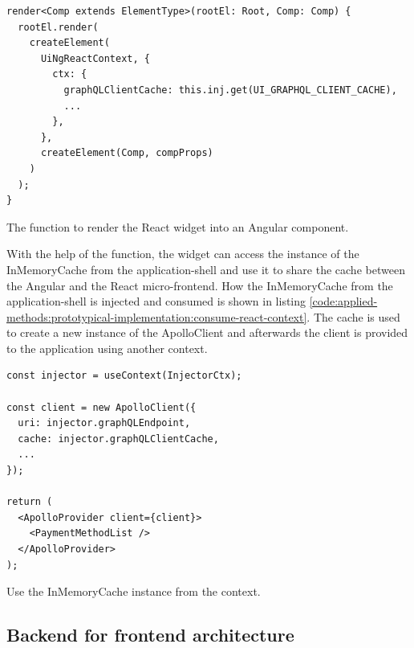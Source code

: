 \ifshowListings
\begin{listing}[H]
    \begin{verbatim}
render<Comp extends ElementType>(rootEl: Root, Comp: Comp) {
  rootEl.render(
    createElement(
      UiNgReactContext, {
        ctx: {
          graphQLClientCache: this.inj.get(UI_GRAPHQL_CLIENT_CACHE),
          ...
        },
      },
      createElement(Comp, compProps)
    )
  );
}
    \end{verbatim}
    \caption{The function to render the React widget into an Angular component.}\label{code:applied-methods:prototypical-implementation:render-react-component-with-context}
\end{listing}
\fi

\noindent With the help of the function, the widget can access the instance of the InMemoryCache from the application-shell and use it to share the cache between the Angular and the React micro-frontend. How the InMemoryCache from the application-shell is injected and consumed is shown in listing \ref{code:applied-methods:prototypical-implementation:consume-react-context}. The cache is used to create a new instance of the ApolloClient and afterwards the client is provided to the application using another context.

\ifshowListings
\begin{listing}[H]
    \begin{verbatim}
const injector = useContext(InjectorCtx);

const client = new ApolloClient({
  uri: injector.graphQLEndpoint,
  cache: injector.graphQLClientCache,
  ...
});

return (
  <ApolloProvider client={client}>
    <PaymentMethodList />
  </ApolloProvider>
);

    \end{verbatim}
    \caption{Use the InMemoryCache instance from the context.}\label{code:applied-methods:prototypical-implementation:consume-react-context}
\end{listing}
\fi

\subsection{Backend for frontend architecture}


